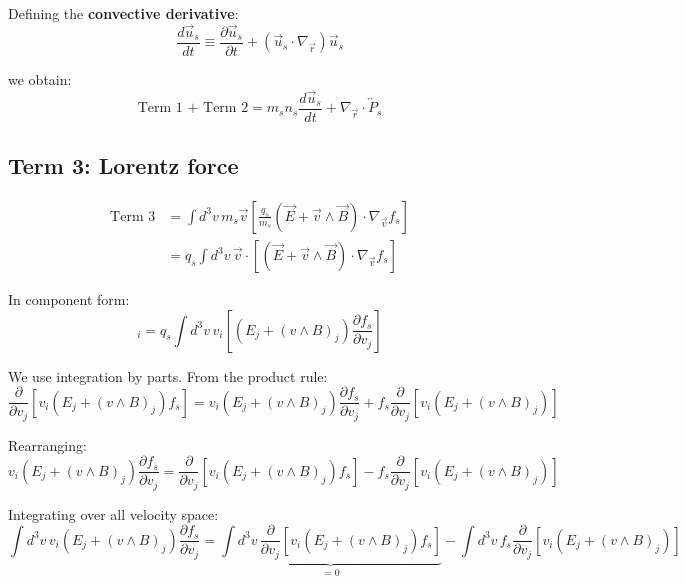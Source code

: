 Defining the \textbf{convective derivative}:
\begin{equation*}
\frac{d\vec{u}_s}{dt} \equiv \frac{\partial \vec{u}_s}{\partial t} + (\vec{u}_s \cdot \nabla_{\vec{r}}) \vec{u}_s
\end{equation*}

we obtain:
\begin{equation*}
 \text{Term 1 + Term 2} = m_s n_s \frac{d\vec{u}_s}{dt} + \nabla_{\vec{r}} \cdot \overleftrightarrow{P}_s
\end{equation*}

\subsection{Term 3: Lorentz force}

\begin{align*}
\text{Term 3} &= \int d^3v \, m_s \vec{v} \left[ \frac{q_s}{m_s}(\vec{E} + \vec{v} \wedge \vec{B}) \cdot \nabla_{\vec{v}} f_s \right]  \\
&= q_s \int d^3v \, \vec{v} \cdot [(\vec{E} + \vec{v} \wedge \vec{B}) \cdot \nabla_{\vec{v}} f_s]
\end{align*}

In component form:
\begin{equation*}
[\text{Term 3}]_i = q_s \int d^3v \, v_i [(E_j + (v \wedge B)_j) \frac{\partial f_s}{\partial v_j}]
\end{equation*}

We use integration by parts. From the product rule:
\begin{equation*}
\frac{\partial}{\partial v_j} [v_i (E_j + (v \wedge B)_j) f_s] = v_i (E_j + (v \wedge B)_j) \frac{\partial f_s}{\partial v_j} + f_s \frac{\partial}{\partial v_j}[v_i (E_j + (v \wedge B)_j)]
\end{equation*}

Rearranging:
\begin{equation*}
v_i (E_j + (v \wedge B)_j) \frac{\partial f_s}{\partial v_j} = \frac{\partial}{\partial v_j} [v_i (E_j + (v \wedge B)_j) f_s] - f_s \frac{\partial}{\partial v_j}[v_i (E_j + (v \wedge B)_j)]
\end{equation*}

Integrating over all velocity space:
\begin{equation*}
\int d^3v \, v_i (E_j + (v \wedge B)_j) \frac{\partial f_s}{\partial v_j} = \underbrace{\int d^3v \, \frac{\partial}{\partial v_j} [v_i (E_j + (v \wedge B)_j) f_s]}_{=0} - \int d^3v \, f_s \frac{\partial}{\partial v_j}[v_i (E_j + (v \wedge B)_j)]
\end{equation*}

